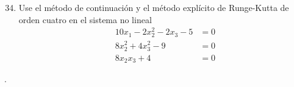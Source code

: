 \begin{frame}
	\begin{enumerate}\setcounter{enumi}{33}
		\item

		      Use el método de continuación y el método explícito de
		      Runge-Kutta de orden cuatro en el sistema no lineal
		      \begin{align*}
			      10x_{1}-2x^{2}_{2}-2x_{3}-5 & =0 \\
			      8x^2_{2}+4x^2_{3}-9         & =0 \\
			      8x_{2}x_{3}+4               & =0
		      \end{align*}
	\end{enumerate}

	\begin{solution}
		.
	\end{solution}
\end{frame}
